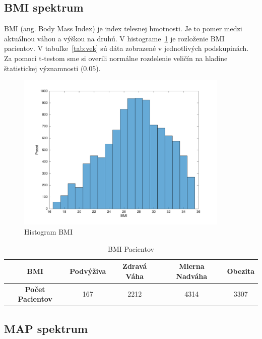 \subsection{BMI spektrum}

BMI (ang. Body Mass Index) je index telesnej hmotnosti. Je to pomer medzi aktuálnou váhou a výškou na druhú. V histograme~\ref{fig:hist-bmi} je rozloženie BMI pacientov. V tabuľke~\ref{tab:vek} sú dáta zobrazené v jednotlivých podskupinách. Za pomoci t-testom sme si overili normálne rozdelenie veličín na hladine štatistickej významnosti (0.05).

\begin{figure}[h!]
	\centering
  		\includegraphics[width=0.9\textwidth]{histBmi.png}
  	\caption{Histogram BMI}
  	\label{fig:hist-bmi}
\end{figure}

\begin{table}[h!]
\centering
\begin{tabular}{c|cccc}
\hline
\textbf{BMI} & Podvýživa & Zdravá Váha & Mierna Nadváha & Obezita \\ \hline
\textbf{Počet Pacientov} & 167       & 2212        & 4314           & 3307    \\ \hline
\end{tabular}
\caption{BMI Pacientov}
\label{tab:bmi}
\end{table}






\subsection{MAP spektrum}

